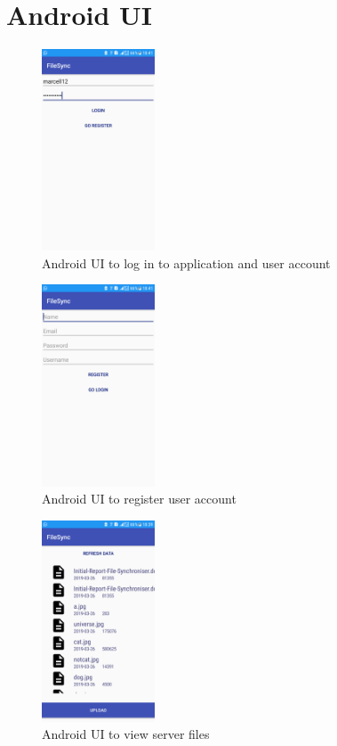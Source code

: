 \documentclass[11pt]{article}
\begin{document}
\section{Android UI}

\begin{figure} [H]
\caption{Android UI to log in to application and user account}
\centering
\includegraphics[width=0.3\textwidth]{Group_Project/login.png}
\end{figure}

\begin{figure} [H]
\caption{Android UI to register user account}
\centering
\includegraphics[width=0.3\textwidth]{Group_Project/register.png}
\end{figure}

\begin{figure} [H]
\caption{Android UI to view server files}
\centering
\includegraphics[width=0.3\textwidth]{Group_Project/files.png}
\end{figure}
\end{document}
